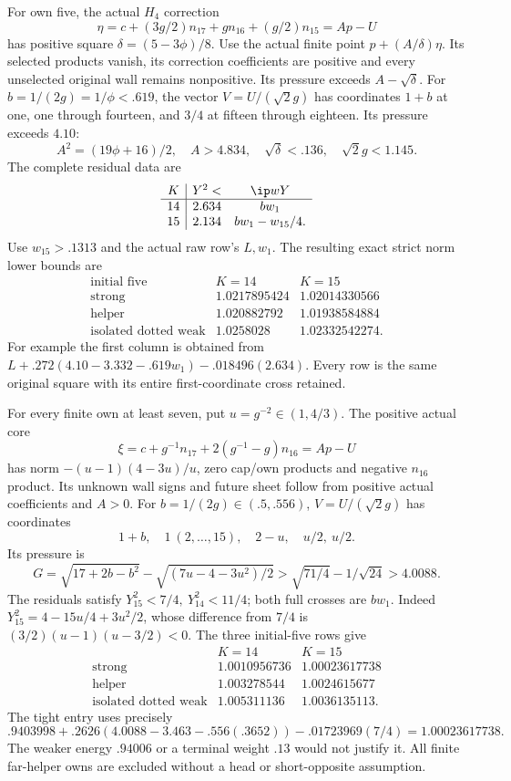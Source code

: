 For own five, the actual \(H_4\) correction
\[
 \eta=c+(3g/2)n_{17}+gn_{16}+(g/2)n_{15}=A p-U
\]
has positive square \(\delta=(5-3\phi)/8\).
Use the actual finite point \(p+(A/\delta)\eta\).
Its selected products vanish, its correction coefficients are
positive and every unselected original wall remains nonpositive.
Its pressure exceeds \(A-\sqrt\delta\).
For \(b=1/(2g)=1/\phi<.619\), the vector \(V=U/(\sqrt2g)\)
has coordinates \(1+b\) at one, one through fourteen, and
\(3/4\) at fifteen through eighteen. Its pressure exceeds \(4.10\):
\[
 A^2=(19\phi+16)/2,\quad
 A>4.834,\quad \sqrt\delta<.136,\quad \sqrt2g<1.145.
\]
The complete residual data are
\[
\begin{array}{c|cc}
K&Y^2<&\ip wY\\ \hline
14&2.634&bw_1\\
15&2.134&bw_1-w_{15}/4 .
\end{array}
\]
Use \(w_{15}>.1313\) and the actual raw row's \(L,w_1\).
The resulting exact strict norm lower bounds are
\[
\begin{array}{c|cc}
\text{initial five}&K=14&K=15\\ \hline
\text{strong}&1.0217895424&1.02014330566\\
\text{helper}&1.020882792&1.01938584884\\
\text{isolated dotted weak}&1.0258028&1.02332542274 .
\end{array}
\]
For example the first column is obtained from
\(L+.272(4.10-3.332-.619w_1)-.018496(2.634)\).
Every row is the same original square with its entire first-coordinate
cross retained.

For every finite own at least seven, put \(u=g^{-2}\in(1,4/3)\).
The positive actual core
\[
 \xi=c+g^{-1}n_{17}+2(g^{-1}-g)n_{16}=A p-U
\]
has norm \(-(u-1)(4-3u)/u\), zero cap/own products
and negative \(n_{16}\) product. Its unknown wall signs and
future sheet follow from positive actual coefficients and \(A>0\).
For \(b=1/(2g)\in(.5,.556)\), \(V=U/(\sqrt2g)\)
has coordinates
\[
 1+b,\quad 1\ (2,\ldots,15),\quad 2-u,\quad u/2,\ u/2 .
\]
Its pressure is
\[
 G=\sqrt{17+2b-b^2}-\sqrt{(7u-4-3u^2)/2}
   >\sqrt{71/4}-1/\sqrt{24}>4.0088 .
\]
The residuals satisfy \(Y_{15}^2<7/4,\ Y_{14}^2<11/4\);
both full crosses are \(bw_1\).
Indeed
\(Y_{15}^2=4-15u/4+3u^2/2\), whose difference from \(7/4\)
is \((3/2)(u-1)(u-3/2)<0\).
The three initial-five rows give
\[
\begin{array}{c|cc}
 &K=14&K=15\\ \hline
\text{strong}&1.0010956736&1.00023617738\\
\text{helper}&1.003278544&1.0024615677\\
\text{isolated dotted weak}&1.005311136&1.0036135113 .
\end{array}
\]
The tight entry uses precisely
\[
 .9403998+.2626(4.0088-3.463-.556(.3652))
       -.01723969(7/4)=1.00023617738.
\]
The weaker energy \(.94006\) or a terminal weight \(.13\)
would not justify it. All finite far-helper owns are excluded
without a head or short-opposite assumption.

